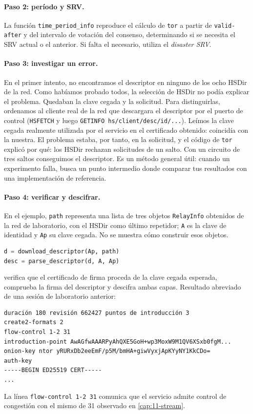 \paragraph{Paso 2: período y SRV.} La función \texttt{time\_period\_info} reproduce el cálculo de \texttt{tor} a partir de \texttt{valid-after} y del intervalo de votación del consenso, determinando si se necesita el SRV actual o el anterior. Si falta el necesario, utiliza el \emph{disaster SRV}.

\paragraph{Paso 3: investigar un error.} En el primer intento, no encontramos el descriptor en ninguno de los ocho HSDir de la red. Como habíamos probado todos, la selección de HSDir no podía explicar el problema. Quedaban la clave cegada y la solicitud. Para distinguirlas, ordenamos al cliente real de la red que descargara el descriptor por el puerto de control (\texttt{HSFETCH} y luego \texttt{GETINFO hs/client/desc/id/...}). Leímos la clave cegada realmente utilizada por el servicio en el certificado obtenido: coincidía con la nuestra. El problema estaba, por tanto, en la solicitud, y el código de \texttt{tor} explicó por qué: los HSDir rechazan solicitudes de un salto. Con un circuito de tres saltos conseguimos el descriptor. Es un método general útil: cuando un experimento falla, busca un punto intermedio donde comparar tus resultados con una implementación de referencia.

\paragraph{Paso 4: verificar y descifrar.} En el ejemplo, \texttt{path} representa una lista de tres objetos \texttt{RelayInfo} obtenidos de la red de laboratorio, con el HSDir como último repetidor; \texttt{A} es la clave de identidad y \texttt{Ap} su clave cegada. No se muestra cómo construir esos objetos.
\begin{lstlisting}[language=Python]
d = download_descriptor(Ap, path)
desc = parse_descriptor(d, A, Ap)
\end{lstlisting}

 verifica que el certificado de firma proceda de la clave cegada esperada, comprueba la firma del descriptor y descifra ambas capas. Resultado abreviado de una sesión de laboratorio anterior:
\begin{lstlisting}[numbers=none]
duración 180 revisión 662427 puntos de introducción 3
create2-formats 2
flow-control 1-2 31
introduction-point AwAGfwAAARPyAhQXE5GoH+wp3MoxW9M1QV6XSxb0fgM...
onion-key ntor yRURxDb2eeEmF/p5M/bmHA+giwVyxjApKYyNY1KkCDo=
auth-key
-----BEGIN ED25519 CERT-----
...
\end{lstlisting}
La línea \texttt{flow-control 1-2 31} comunica que el servicio admite control de congestión con el mismo  de 31 observado en \cref{cap:11-stream}.

